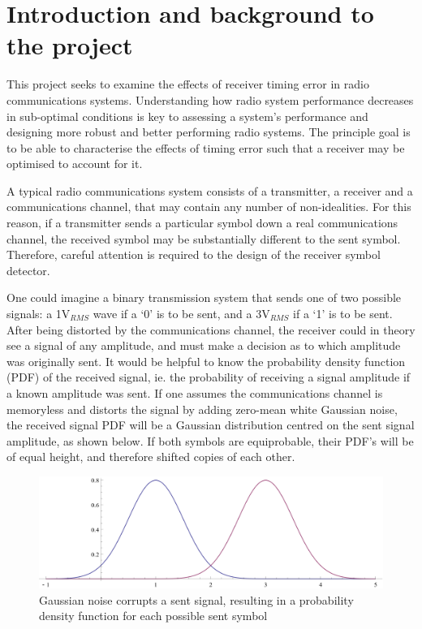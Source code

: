 \chapter{Introduction and background to the project}

This project seeks to examine the effects of receiver timing error in
radio communications systems. Understanding how radio system performance
decreases in sub-optimal conditions is key to assessing a system's
performance and designing more robust and better performing radio systems. The
principle goal is to be able to characterise the effects of timing error such
that a receiver may be optimised to account for it.

A typical radio communications system consists of a transmitter, a
receiver and a communications channel, that may contain any number of
non-idealities. For this reason, if a transmitter sends a particular
symbol down a real communications channel, the received symbol may be
substantially different to the sent symbol. Therefore, careful attention
is required to the design of the receiver symbol detector.

One could imagine a binary transmission system that sends one of two
possible signals: a 1V$_{RMS}$ wave if a `0' is to be sent, and a
3V$_{RMS}$ if a `1' is to be sent. After being distorted by the
communications channel, the receiver could in theory see a signal of any
amplitude, and must make a decision as to which amplitude was originally
sent. It would be helpful to know the probability density function (PDF)
of the received signal, ie. the probability of receiving a signal
amplitude if a known amplitude was sent. If one assumes the communications
channel is memoryless and distorts the signal by adding zero-mean white Gaussian noise,
the received signal PDF will be a Gaussian distribution centred on the
sent signal amplitude, as shown below. If both symbols are equiprobable, their PDF's will be of equal height, and therefore shifted copies of each other.

\begin{figure}[htbp]
\centering
\includegraphics[width=\linewidth]{4-PAM_PDF.png}
\caption{Gaussian noise corrupts a sent signal, resulting in a
probability density function for each possible sent symbol}
\end{figure}


